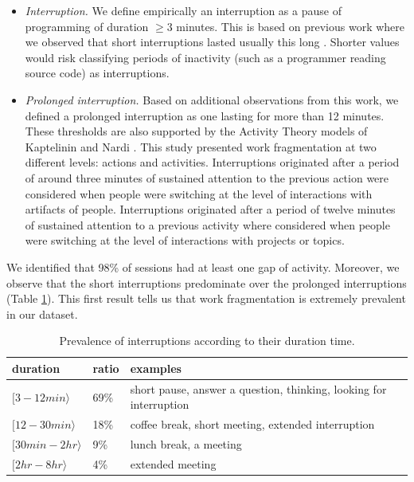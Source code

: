 \documentclass[times]{smrauth}
\newcommand\RR[1]{\textbf{Romain #1}}
\begin{document}
\begin{itemize}
	\item \textit{Interruption.} We define empirically an interruption as a pause of programming of duration $\geq 3$ minutes. This is based on previous work where we observed that short interruptions lasted usually this long \cite{GM04}. Shorter values would risk classifying periods of inactivity (such as a programmer reading source code) as interruptions.
	
	\item \textit{Prolonged interruption.} Based on additional observations from this work, we defined a prolonged interruption as one lasting for more than 12 minutes. These thresholds are also supported by the Activity Theory models of Kaptelinin and Nardi \cite{KaptelininN07}. This study presented work fragmentation at two different levels: actions and activities. Interruptions originated after a period of around three minutes of sustained attention to the previous action were considered when people were switching at the level of interactions with artifacts of people. Interruptions originated after a period of twelve minutes of sustained attention to a previous activity where considered when people were switching at the level of interactions with projects or topics.  
\end{itemize}



We identified that 98\% of sessions had at least one gap of activity. Moreover, we observe that the short interruptions predominate over the prolonged interruptions (Table \ref{tbl:by_duration}). This first result tells us that work fragmentation is extremely prevalent in our dataset.

\begin{table}[ht!]
	\small
	\renewcommand{\arraystretch}{1.3}
	\caption{Prevalence of interruptions according to their duration time. }
	\label{tbl:by_duration}
	\centering
	\begin{tabular}{p{3cm}|p{0.8cm}|p{6cm}} 
		duration & ratio & examples  \\
		\hline   
		$[3  - 12 min \rangle$ & 69\% & short pause, answer a question, thinking, looking for interruption  \\ 
		\hline 
		$[12  - 30 min \rangle$ & 18\% & coffee break, short meeting, extended interruption  \\
		$[30 min - 2 hr \rangle$  & 9\% & lunch break, a meeting  \\
		$[2 hr - 8 hr \rangle$ & 4\% & extended meeting \\
	\end{tabular}
\end{table}
\end{document}
